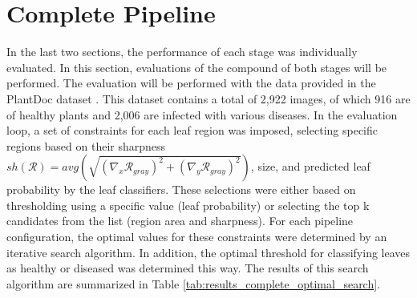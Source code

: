 \documentclass[draft,final]{vutinfth} %
\begin{document}
\section{Complete Pipeline} \label{sec:results_total}
In the last two sections, the performance of each stage was individually evaluated. In this section, evaluations of the compound of both stages will be performed. The evaluation will be performed with the data provided in the PlantDoc dataset \cite{singh_plantdoc_2020}. This dataset contains a total of 2,922 images, of which 916 are of healthy plants and 2,006 are infected with various diseases.
In the evaluation loop, a set of constraints for each leaf region was imposed, selecting specific regions based on their sharpness $sh(\mathcal{R}) = avg(\sqrt{(\nabla_x \mathcal{R}_{gray})^2 + (\nabla_y \mathcal{R}_{gray})^2})$, size, and predicted leaf probability by the leaf classifiers. These selections were either based on thresholding using a specific value (leaf probability) or selecting the top k candidates from the list (region area and sharpness). 
For each pipeline configuration, the optimal values for these constraints were determined by an iterative search algorithm. In addition, the optimal threshold for classifying leaves as healthy or diseased was determined this way. The results of this search algorithm are summarized in Table \ref{tab:results_complete_optimal_search}.
\end{document}
